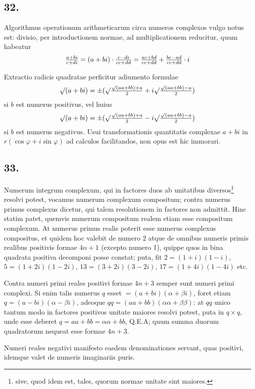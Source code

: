 \documentclass[twoside,12pt]{memoir}
\let\oldfrac\frac
\def\frac#1#2{\mathchoice{\tfrac{#1}{#2}}{\oldfrac{#1}{#2}}{\genfrac{}{}{}{2}{#1}{#2\mathstrut}}{\genfrac{}{}{}{3}{#1}{#2\mathstrut}}}
\begin{document}
\subsection*{32.}
 
Algorithmus operationum arithmeticarum circa numeros complexos vulgo notus est: divisio, per introductionem normae, ad multiplicationem reducitur, quum habeatur
\[\frac{a+b i}{c+d i}=(a+b i) \cdot \frac{c-d i}{c c+d d}=\frac{a c+b d}{c c+d d}+\frac{b c-a d}{c c+d d} \cdot i\]
 
Extractio radicis quadratae perficitur adiumento formulae
\[\surd(a+b i)= \pm(\surd \frac{\surd(a a+b b)+a}{2}+i \surd \frac{\surd(a a+b b)-a}{2})\]
si \(b\) est numerus positivus, vel huius
\[\surd(a+b i)= \pm(\surd \frac{\surd(a a+b b)+a}{2}-i \surd \frac{\surd(a a+b b)-a}{2})\]
si \(b\) est numerus negativus. Usui transformationis quantitatis complexae \(a+b i\) in \(r(\cos \varphi+i \sin \varphi)\) ad calculos facilitandos, non opus est hic immorari.

\subsection*{33.}
 
Numerum integrum complexum, qui in factores duos ab unitatibus diversos\footnote{sive, quod idem est, tales, quorum normae unitate sint maiores.} resolvi potest, vocamus numerum complexum compositum; contra numerus primus complexus dicetur, qui talem resolutionem in factores non admittit. Hinc statim patet, quemvis numerum compositum realem etiam esse compositum complexum. At numerus primus realis poterit esse numerus complexus compositus, et quidem hoc valebit de numero \(2\) atque de omnibus numeris primis realibus positivis formae \(4 n+1\) (excepto numero 1), quippe quos in bina quadrata positiva decomponi posse constat; puta, fit \(2=(1+i)(1-i)\), \(5=(1+2 i)(1-2 i)\), \(13=(3+2 i)(3-2 i)\), \(17=(1+4 i)(1-4 i)\) etc.
 
Contra numeri primi reales positivi formae \(4 n+3\) semper sunt numeri primi complexi. Si enim talis numerus \(q\) esset \(=(a+b i)(\alpha+\beta i)\), foret etiam \(q=(a-b i)(\alpha-\beta i)\), adeoque \(q q=(a a+b b)(\alpha \alpha+\beta \beta)\): at \(q q\) unico tantum modo in factores positivos unitate maiores resolvi potest, puta in \(q \times q\), unde esse deberet \(q=a a+b b=\alpha \alpha+b b\), Q.E.A; quum summa duorum quadratorum nequeat esse formae \(4 n+3\).\pagebreak%

Numeri reales negativi manifesto easdem denominationes servant, quas positivi, idemque valet de numeris imaginariis puris.
 
\end{document}
